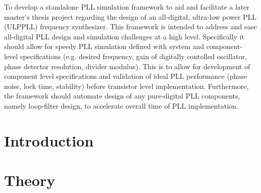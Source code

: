 	To develop a standalone PLL simulation framework to aid and facilitate a later master's thesis project regarding the design of an all-digital, ultra-low power PLL (ULPPLL) frequency synthesizer. This framework is intended to address and ease all-digital PLL design and simulation challenges at a high level. Specifically it should allow for speedy PLL simulation defined with system and component- level specifications (e.g. desired frequency, gain of digitally contolled oscillator, phase detector resolution, divider modulus). This is to allow for development of component level specifications and validation of ideal PLL performance (phase noise, lock time, stability) before transistor level implementation. Furthermore, the framework should automate design of any pure-digital PLL components, namely loop-filter design, to accelerate overall time of PLL implementation.


	\fontfamily{\sfdefault}\selectfont 
	\thispagestyle{nohdr}
	\null\pagebreak
	\thispagestyle{nohdr}
	\null\pagebreak
	\tableofcontents
	\pagebreak
	\listoffigures
	\listoftables


	\fontfamily{\rmdefault}\selectfont 
	

	\pagebreak
	\FloatBarrier

	\section{Introduction}\label{intro}
	
	\pagebreak
	\FloatBarrier

	\section{Theory}\label{theory}
	
	

